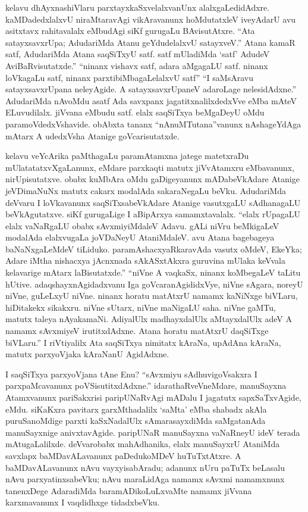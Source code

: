 kelavu dhAyxnashiVlaru parxtayxkaSxvelalxvanUnx alalxgaLedidAdxre. kaMDadedxlalxvU niraMtaravAgi vikAravanunx hoMdutatxleV iveyAdarU avu asitxtavx rahitavalalx eMbudAgi siKf gurugaLu BAvisutAtxre. ``Ata satayxsavxrUpa; AdudariMda Atanu geYdudelalxvU satayxveV.'' Atana kamaR satf, AdudariMda Atana saqSiTxyU satf. satf mUladiMda `satf' AdudeV AviBaRvisutatxde.'' ``ninanx vishavx satf, adara aMgagaLU satf. ninanx loVkagaLu satf, ninanx parxtibiMbagaLelalxvU satf'' ``I saMsAravu satayxsavxrUpana neleyAgide. A satayxsavxrUpaneV adaroLage nelesidAdxne.'' AdudariMda nAvoMdu asatf Ada savxpanx jagatitxnalilxdedxVve eMba mAteV ELuvudilalx. jiVvana eMbudu satf. elalx saqSiTxya beMgaDeyU oMdu paramoVdedxVshavide. obAbxta tananx ``nAnuMTutana''vanunx nAshageYdAga mAtarx A udedxVsha Atanige goVcarisutatxde.

kelavu veYcArika paMthagaLu paramAtamxna jatege matetxraDu mUlatatatxvXgaLanunx, eMdare parxkaqti matutx jiVvAtamxru eMbavanunx, nirUpisutatxve. obabx kuMbAra oMdu gaDigeyanunx mADabeVkAdare Atanige jeVDimaNuNx matutx cakarx modalAda sakaraNegaLu beVku. AdudariMda deVvaru I loVkavanunx saqSiTxsabeVkAdare Atanige vasutxgaLU sAdhanagaLU beVkAgutatxve. siKf gurugaLige I aBipArxya samamxtavalalx. ``elalx rUpagaLU elalx vaNaRgaLU obabx sAvxmiyiMdaleV Adavu. gALi niVru beMkigaLeV modalAda elalxvugaLa joVDaNeyU AtaniMdaleV. avu Atana bagebageya baNaNxgaLeMdeV tiLiduko. paramAshacxyaRkaravAda vasutx oMdeV, EkeYka; Adare iMtha nishacxya jAcnxnada sAkASxtAkxra guruvina mUlaka keVvala kelavarige mAtarx laBisutatxde.'' ``niVne A vaqkaSx, ninanx koMbegaLeV taLitu hUtive. adaqshayxnAgidadxvanu Iga goVcaranAgididxVye, niVne sAgara, noreyU niVne, guLeLxyU niVne. ninanx horatu matAtxrU namamx kaNiNxge biVLaru, hiDitakekx sikakxru. niVne sUtarx, niVne maNigaLU saha. niVne gaMTu, matutx taleya nAyakamaNi. AdiyalUlx madhayxdalUlx aMtayxdalUlx adeV A namamx sAvxmiyeV irutitxdAdxne. Atana horatu matAtxrU daqSiTxge biVLaru.'' I riVtiyalilx Ata saqSiTxya nimitatx kAraNa, upAdAna kAraNa, matutx parxyoVjaka kAraNanU AgidAdxne.

I saqSiTxya parxyoVjana tAne Enu? ``sAvxmiyu sAdhuvigoVsakxra I parxpaMcavanunx poVSisutitxdAdxne.'' idarathaRveVneMdare, manuSayxna Atamxvanunx pariSakxrisi paripUNaRvAgi mADalu I jagatutx sapxSaTxvAgide, eMdu. siKaKxra pavitarx garxMthadalilx `saMta' eMba shabadx akAla puruSanoMdige parxti kaSxNadalUlx sAmarasayxdiMda saMgatanAda manuSayxnige anivxtavAgide. paripUNaR manuSayxna vaNaRneyU ideV terada mAtugaLalilxde. deVvarobabx mahAdhanika, elalx manuSayxrU AtaniMda savxlapx baMDavALavanunx paDedukoMDeV huTuTxtAtxre. A baMDavALavanunx nAvu vayxyisabAradu; adanunx nUru paTuTx beLasalu nAvu parxyatinxsabeVku; nAvu maraLidAga namamx sAvxmi namamxnunx tanenxDege AdaradiMda baramADikoLuLxvaMte namamx jiVvana karxmavanunx I vaqdidhxge tidadxbeVku.

